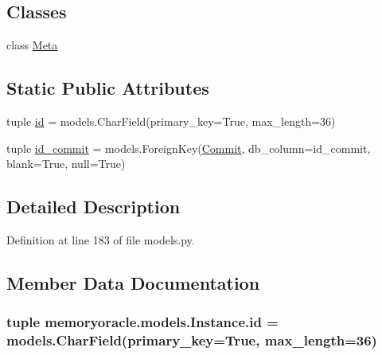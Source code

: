 \subsection*{Classes}
\begin{DoxyCompactItemize}
\item 
class \hyperlink{classmemoryoracle_1_1models_1_1Instance_1_1Meta}{Meta}
\end{DoxyCompactItemize}
\subsection*{Static Public Attributes}
\begin{DoxyCompactItemize}
\item 
tuple \hyperlink{classmemoryoracle_1_1models_1_1Instance_a99b10b483feac957334333de150780f8}{id} = models.\+Char\+Field(primary\+\_\+key=True, max\+\_\+length=36)
\item 
tuple \hyperlink{classmemoryoracle_1_1models_1_1Instance_aeece54a5639c30b9f8eb968266e78d07}{id\+\_\+commit} = models.\+Foreign\+Key(\hyperlink{classmemoryoracle_1_1models_1_1Commit}{Commit}, db\+\_\+column=\textquotesingle{}id\+\_\+commit\textquotesingle{}, blank=True, null=True)
\end{DoxyCompactItemize}


\subsection{Detailed Description}


Definition at line 183 of file models.\+py.



\subsection{Member Data Documentation}
\hypertarget{classmemoryoracle_1_1models_1_1Instance_a99b10b483feac957334333de150780f8}{}
\subsubsection[{id}]{\setlength{\rightskip}{0pt plus 5cm}tuple memoryoracle.\+models.\+Instance.\+id = models.\+Char\+Field(primary\+\_\+key=True, max\+\_\+length=36)\hspace{0.3cm}{\ttfamily [static]}}\label{classmemoryoracle_1_1models_1_1Instance_a99b10b483feac957334333de150780f8}


